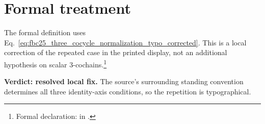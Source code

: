\documentclass{article}
\begin{document}
\section{Formal treatment}

The formal definition uses
Eq.~\ref{eq:fbc25_three_cocycle_normalization_typo_corrected}.
This is a local correction of the repeated case in the printed display, not an
additional hypothesis on scalar $3$-cochains.\footnote{Formal declaration:
 in
.}

\textbf{Verdict: resolved local fix.}
The source's surrounding standing convention determines all three
identity-axis conditions, so the repetition is typographical.



\end{document}
